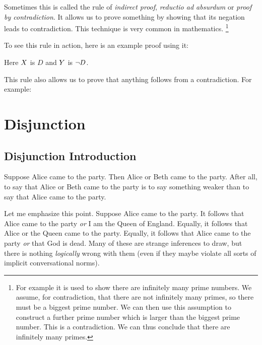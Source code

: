 Sometimes this is called the rule of \emph{indirect proof}, \emph{reductio ad absurdum} or \emph{proof by contradiction}. It allows us to prove something by showing that its negation leads to contradiction. This technique is very common in mathematics.%
\footnote{
	For example it is used to show there are infinitely many prime numbers. We assume, for contradiction, that there are not infinitely many primes, so there must be a biggest prime number. We can then use this assumption to construct a further prime number which is larger than the biggest prime number. This is a contradiction. We can thus conclude that there are infinitely many primes.
}



To see this rule in action, here is an example proof using it:
\begin{fitchproof}
	\open
	\close
\end{fitchproof}
Here $X$ is $D$ and $Y$ is $\neg D$. 


This rule also allows us to prove that anything follows from a contradiction. For example:
\begin{fitchproof}
	\open
	\close
\end{fitchproof}


\section{Disjunction}

\subsection{Disjunction Introduction}
Suppose Alice came to the party. Then Alice or Beth came to the party. After all, to say that Alice or Beth came to the party is to say something weaker than to say that Alice came to the party.

Let me emphasize this point. Suppose Alice came to the party. It follows that Alice came to the party \emph{or} I am the Queen of England. Equally, it follows that Alice or the Queen came to the party.  Equally, it follows that Alice came to the party \emph{or} that God is dead. Many of these are strange inferences to draw, but there is nothing \emph{logically} wrong with them (even if they maybe violate all sorts of implicit conversational norms).

